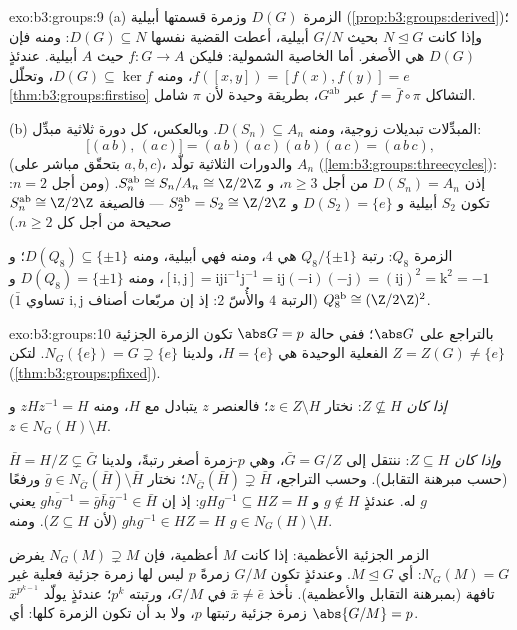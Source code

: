 \begin{solution}{exo:b3:groups:9}
(a) الزمرة $D(G)$  وزمرة قسمتها أبيلية (\cref{prop:b3:groups:derived})؛ وإذا
كانت $N \trianglelefteq G$ بحيث $G/N$ أبيلية، أعطت القضية نفسها $D(G) \subseteq N$: ومنه
فإن $D(G)$ هي الأصغر. أما الخاصية الشمولية: فليكن $f \colon G \to A$ حيث $A$
أبيلية. عندئذٍ $f([x,y]) = [f(x), f(y)] = e$، ومنه $D(G)
\subseteq \ker f$، وتحلّل \cref{thm:b3:groups:firstiso} التشاكل
$f =
\bar f \circ \pi$ عبر $G^{\mathrm{ab}}$، بطريقة وحيدة لأن $\pi$ شامل.

(b) المبدِّلات تبديلات زوجية، ومنه $D(S_n) \subseteq A_n$. وبالعكس، كل دورة
ثلاثية مبدِّل:
\[
\bigl[(a\,b),\,(a\,c)\bigr] = (a\,b)(a\,c)(a\,b)(a\,c) =
(a\,b\,c),
\]
(بتحقّق مباشر على $a, b, c$)، والدورات الثلاثية تولّد $A_n$
(\cref{lem:b3:groups:threecycles}): إذن $D(S_n) = A_n$ من أجل $n \geq 3$، و $S_n^{\mathrm{ab}} \cong S_n/A_n \cong \Z/2\Z$.
(ومن أجل $n = 2$: تكون $S_2$ أبيلية و $D(S_2) = \{e\}$ و $S_2^{\mathrm{ab}} = S_2
\cong \Z/2\Z$
--- فالصيغة $S_n^{\mathrm{ab}} \cong \Z/2\Z$ صحيحة من أجل كل $n \geq 2$.)

الزمرة $Q_8$: رتبة  $Q_8/\{\pm 1\}$ هي $4$، ومنه فهي
أبيلية، ومنه $D(Q_8) \subseteq \{\pm 1\}$؛ و $[\mathrm i, \mathrm
j] = \mathrm i \mathrm j \mathrm i^{-1}\mathrm j^{-1} = \mathrm
i\mathrm j(-\mathrm i)(-\mathrm j) = (\mathrm i \mathrm j)^2 =
\mathrm k^2 = -1$، ومنه $D(Q_8) = \{\pm 1\}$ و $Q_8^{\mathrm{ab}} \cong (\Z/2\Z)^2$ (الرتبة
$4$ والأُسّ $2$: إذ إن مربّعات أصناف $\mathrm i, \mathrm j$ تساوي $\bar 1$).
\end{solution}

\begin{solution}{exo:b3:groups:10}
بالتراجع على $\abs G$؛ ففي حالة $\abs G = p$ تكون الزمرة الجزئية
الفعلية الوحيدة هي $H = \{e\}$، ولدينا $N_G(\{e\}) = G \supsetneq
\{e\}$. لتكن $Z = Z(G) \neq \{e\}$
(\cref{thm:b3:groups:pfixed}).

\emph{إذا كان $Z \not\subseteq H$}: نختار $z \in Z \setminus H$؛ فالعنصر $z$ يتبادل مع $H$،
ومنه $zHz^{-1} = H$ و $z \in N_G(H) \setminus
H$.

\emph{وإذا كان $Z \subseteq H$}: ننتقل إلى $\bar G = G/Z$، وهي
$p$-زمرة أصغر رتبةً، ولدينا $\bar H = H/Z \subsetneq \bar G$ (حسب مبرهنة التقابل). وحسب
التراجع، $N_{\bar G}(\bar H) \supsetneq \bar H$؛ نختار $\bar g \in N_{\bar G}(\bar H) \setminus \bar H$ ورفعًا $g$ له. عندئذٍ
$g \notin H$ و $gHg^{-1} \subseteq HZ = H$: إذ إن $\overline{ghg^{-1}} = \bar g \bar h \bar g^{-1} \in \bar H$ يعني $ghg^{-1} \in HZ = H$ (لأن
$Z \subseteq H$). ومنه $g \in
N_G(H)\setminus H$.

الزمر الجزئية الأعظمية: إذا كانت $M$ أعظمية، فإن $N_G(M) \supsetneq M$ يفرض
$N_G(M) = G$: أي $M \trianglelefteq G$. وعندئذٍ تكون $G/M$ زمرةً $p$ ليس لها
زمرة جزئية فعلية غير تافهة (بمبرهنة التقابل والأعظمية). نأخذ
$\bar x \neq \bar e$ في $G/M$، ورتبته $p^k$؛ عندئذٍ يولّد $\bar x^{p^{k-1}}$ زمرة جزئية
رتبتها $p$، ولا بد أن تكون الزمرة كلها: أي $\abs{G/M} = p$.
\end{solution}

